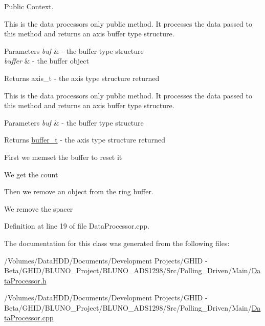 \-Public \-Context. 

\-This is the data processors only public method. \-It processes the data passed to this method and returns an axis buffer type structure.


\begin{DoxyParams}{\-Parameters}
{\em buf} & -\/ the buffer type structure \\
\hline
{\em buffer} & -\/ the buffer object \\
\hline
\end{DoxyParams}
\begin{DoxyReturn}{\-Returns}
axis\-\_\-t -\/ the axis type structure returned
\end{DoxyReturn}
\-This is the data processors only public method. \-It processes the data passed to this method and returns an axis buffer type structure.


\begin{DoxyParams}{\-Parameters}
{\em buf} & -\/ the buffer type structure \\
\hline
\end{DoxyParams}
\begin{DoxyReturn}{\-Returns}
\hyperlink{structbuffer__t}{buffer\-\_\-t} -\/ the axis type structure returned 
\end{DoxyReturn}
\-First we memset the buffer to reset it

\-We get the count

\-Then we remove an object from the ring buffer.

\-We remove the spacer 

\-Definition at line 19 of file \-Data\-Processor.\-cpp.



\-The documentation for this class was generated from the following files\-:\begin{DoxyCompactItemize}
\item 
/\-Volumes/\-Data\-H\-D\-D/\-Documents/\-Development Projects/\-G\-H\-I\-D -\/ Beta/\-G\-H\-I\-D/\-B\-L\-U\-N\-O\-\_\-\-Project/\-B\-L\-U\-N\-O\-\_\-\-A\-D\-S1298/\-Src/\-Polling\-\_\-\-Driven/\-Main/\hyperlink{_data_processor_8h}{\-Data\-Processor.\-h}\item 
/\-Volumes/\-Data\-H\-D\-D/\-Documents/\-Development Projects/\-G\-H\-I\-D -\/ Beta/\-G\-H\-I\-D/\-B\-L\-U\-N\-O\-\_\-\-Project/\-B\-L\-U\-N\-O\-\_\-\-A\-D\-S1298/\-Src/\-Polling\-\_\-\-Driven/\-Main/\hyperlink{_data_processor_8cpp}{\-Data\-Processor.\-cpp}\end{DoxyCompactItemize}
